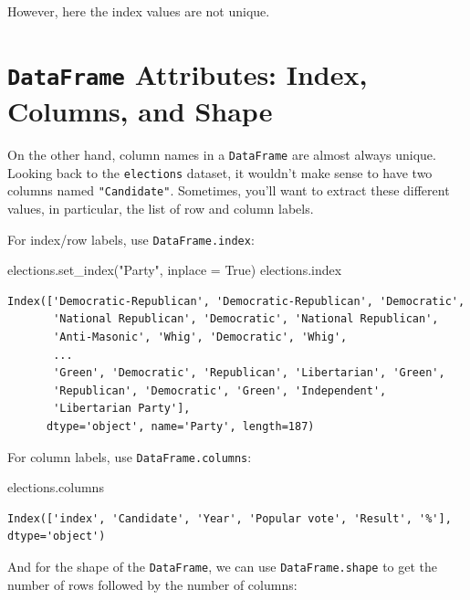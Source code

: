 \documentclass[
  letterpaper,
  DIV=11,
  numbers=noendperiod]{scrreprt}
\newenvironment{Shaded}{\begin{snugshade}}{\end{snugshade}}
\newcommand{\NormalTok}[1]{\textcolor[rgb]{0.00,0.23,0.31}{#1}}
\newcommand{\OperatorTok}[1]{\textcolor[rgb]{0.37,0.37,0.37}{#1}}
\newcommand{\StringTok}[1]{\textcolor[rgb]{0.13,0.47,0.30}{#1}}
\newcommand{\VariableTok}[1]{\textcolor[rgb]{0.07,0.07,0.07}{#1}}
\begin{document}
However, here the index values are not unique.

\section{\texorpdfstring{\texttt{DataFrame} Attributes: Index, Columns,
and
Shape}{DataFrame Attributes: Index, Columns, and Shape}}\label{dataframe-attributes-index-columns-and-shape}

On the other hand, column names in a \texttt{DataFrame} are almost
always unique. Looking back to the \texttt{elections} dataset, it
wouldn't make sense to have two columns named \texttt{"Candidate"}.
Sometimes, you'll want to extract these different values, in particular,
the list of row and column labels.

For index/row labels, use \texttt{DataFrame.index}:

\begin{Shaded}
\begin{Highlighting}[]
\NormalTok{elections.set\_index(}\StringTok{"Party"}\NormalTok{, inplace }\OperatorTok{=} \VariableTok{True}\NormalTok{)}
\NormalTok{elections.index}
\end{Highlighting}
\end{Shaded}

\begin{verbatim}
Index(['Democratic-Republican', 'Democratic-Republican', 'Democratic',
       'National Republican', 'Democratic', 'National Republican',
       'Anti-Masonic', 'Whig', 'Democratic', 'Whig',
       ...
       'Green', 'Democratic', 'Republican', 'Libertarian', 'Green',
       'Republican', 'Democratic', 'Green', 'Independent',
       'Libertarian Party'],
      dtype='object', name='Party', length=187)
\end{verbatim}

For column labels, use \texttt{DataFrame.columns}:

\begin{Shaded}
\begin{Highlighting}[]
\NormalTok{elections.columns}
\end{Highlighting}
\end{Shaded}

\begin{verbatim}
Index(['index', 'Candidate', 'Year', 'Popular vote', 'Result', '%'], dtype='object')
\end{verbatim}

And for the shape of the \texttt{DataFrame}, we can use
\texttt{DataFrame.shape} to get the number of rows followed by the
number of columns:
\end{document}

